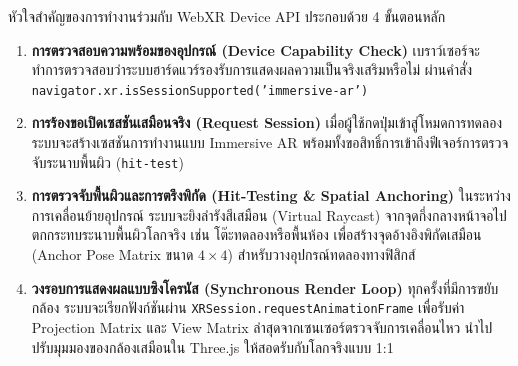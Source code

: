 หัวใจสำคัญของการทำงานร่วมกับ WebXR Device API ประกอบด้วย 4 ขั้นตอนหลัก
\begin{enumerate}
    \item \textbf{การตรวจสอบความพร้อมของอุปกรณ์ (Device Capability Check)} เบราว์เซอร์จะทำการตรวจสอบว่าระบบฮาร์ดแวร์รองรับการแสดงผลความเป็นจริงเสริมหรือไม่ ผ่านคำสั่ง \texttt{navigator.xr.isSessionSupported('immersive-ar')}
    \item \textbf{การร้องขอเปิดเซสชันเสมือนจริง (Request Session)} เมื่อผู้ใช้กดปุ่มเข้าสู่โหมดการทดลอง ระบบจะสร้างเซสชันการทำงานแบบ Immersive AR พร้อมทั้งขอสิทธิ์การเข้าถึงฟีเจอร์การตรวจจับระนาบพื้นผิว (\texttt{hit-test})
    \item \textbf{การตรวจจับพื้นผิวและการตรึงพิกัด (Hit-Testing \& Spatial Anchoring)} ในระหว่างการเคลื่อนย้ายอุปกรณ์ ระบบจะยิงลำรังสีเสมือน (Virtual Raycast) จากจุดกึ่งกลางหน้าจอไปตกกระทบระนาบพื้นผิวโลกจริง เช่น โต๊ะทดลองหรือพื้นห้อง เพื่อสร้างจุดอ้างอิงพิกัดเสมือน (Anchor Pose Matrix ขนาด $4 \times 4$) สำหรับวางอุปกรณ์ทดลองทางฟิสิกส์
    \item \textbf{วงรอบการแสดงผลแบบซิงโครนัส (Synchronous Render Loop)} ทุกครั้งที่มีการขยับกล้อง ระบบจะเรียกฟังก์ชันผ่าน \texttt{XRSession.requestAnimationFrame} เพื่อรับค่า Projection Matrix และ View Matrix ล่าสุดจากเซนเซอร์ตรวจจับการเคลื่อนไหว นำไปปรับมุมมองของกล้องเสมือนใน Three.js ให้สอดรับกับโลกจริงแบบ 1:1
\end{enumerate}

